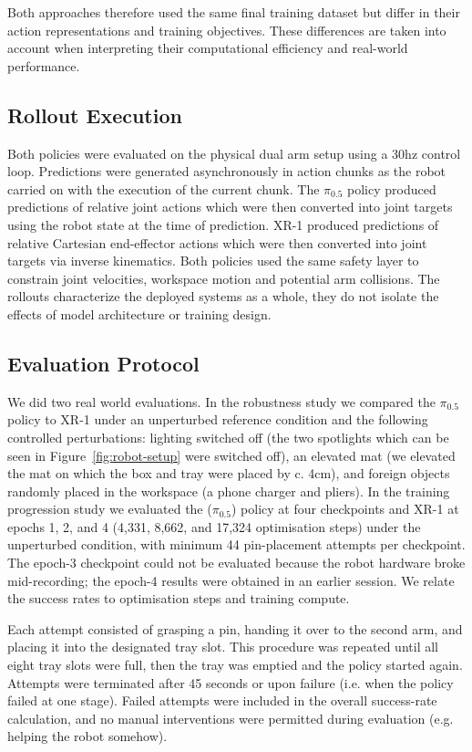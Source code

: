 \documentclass[10pt,twocolumn,letterpaper]{article}
\begin{document}
Both approaches therefore used the same final training dataset but differ in their action representations and training objectives. These differences are taken into account when interpreting their computational efficiency and real-world performance.

\subsection{Rollout Execution}
Both policies were evaluated on the physical dual arm setup using a 30hz control loop. Predictions were generated asynchronously in action chunks as the robot carried on with the execution of the current chunk. The $\pi_{0.5}$ policy produced predictions of relative joint actions which were then converted into joint targets using the robot state at the time of prediction. XR-1 produced predictions of relative Cartesian end-effector actions which were then converted into joint targets via inverse kinematics. Both policies used the same safety layer to constrain joint velocities, workspace motion and potential arm collisions. The rollouts characterize the deployed systems as a whole, they do not isolate the effects of model architecture or training design.

\subsection{Evaluation Protocol}
We did two real world evaluations. In the robustness study we compared the $\pi_{0.5}$ policy to XR-1 under an unperturbed reference condition and the following controlled perturbations: lighting switched off (the two spotlights which can be seen in Figure~\ref{fig:robot-setup} were switched off), an elevated mat (we elevated the mat on which the box and tray were placed by c. 4cm), and foreign objects randomly placed in the workspace (a phone charger and pliers). In the training progression study we evaluated the ($\pi_{0.5}$) policy at four checkpoints and XR-1 at epochs 1, 2, and 4 (4,331, 8,662, and 17,324 optimisation steps) under the unperturbed condition, with minimum 44 pin-placement attempts per checkpoint. The epoch-3 checkpoint could not be evaluated because the robot hardware broke mid-recording; the epoch-4 results were obtained in an earlier session. We relate the success rates to optimisation steps and training compute.

Each attempt consisted of grasping a pin, handing it over to the second arm, and placing it into the designated tray slot. This procedure was repeated until all eight tray slots were full, then the tray was emptied and the policy started again. Attempts were terminated after 45 seconds or upon failure (i.e. when the policy failed at one stage). Failed attempts were included in the overall success-rate calculation, and no manual interventions were permitted during evaluation (e.g. helping the robot somehow).
\end{document}
